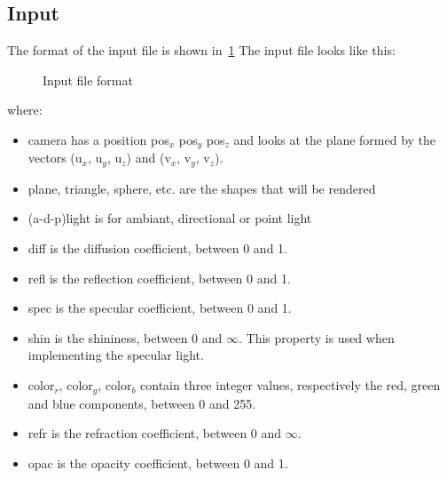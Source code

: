 \documentclass[a4paper,12pt,journal,twoside,compsoc]{PPIEEEtran}
\begin{document}
\subsection{Input}
The format of the input file is shown in~\ref{Fig:input}
The input file looks like this: \\
\begin{figure}
\noindent{}\vspace{0.3cm}
\caption{Input file format}
\label{Fig:input}
\end{figure}
    where:
    \begin{itemize}
    	\small
    	\setlength{\itemsep}{0.2pt}
        \item camera has a position pos$_x$ pos$_y$ pos$_z$ and looks at the plane formed by the vectors (u$_x$, u$_y$, u$_z$) and (v$_x$, v$_y$, v$_z$).
        \item plane, triangle, sphere, etc. are the shapes that will be rendered
        \item (a-d-p)light is for ambiant, directional or point light
    	\item diff is the diffusion coefficient, between 0 and 1.
    	\item refl is the reflection coefficient, between 0 and 1.
        \item spec is the specular coefficient, between 0 and 1.
        \item shin is the shininess, between 0 and $\infty$. This property is used when implementing the specular light.
        \item color$_r$, color$_g$, color$_b$ contain three integer values, respectively the red, green and blue components, between 0 and 255.
		\item refr is the refraction coefficient, between 0 and $\infty$.
        \item opac is the opacity coefficient, between 0 and 1.
    \end{itemize}
\end{document}
